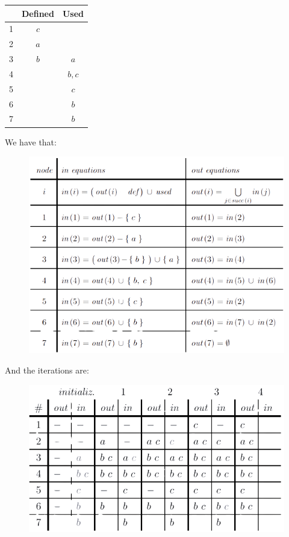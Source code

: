 \documentclass[12pt, a4paper]{report}
\newtheorem[style=M, bodystyle=\normalfont]{theorem}{Theorem}
\newtheorem[style=M, bodystyle=\normalfont]{corollary}{Corollary}
\newtheorem[style=M, bodystyle=\normalfont]{lemma}{Lemma}
\newtheorem[style=M, bodystyle=\normalfont]{definition}{Definition}
\begin{document}
\begin{enumerate}
\begin{table}[H]
                    \centering
                    \begin{tabular}{l|c|c|}
                    \cline{2-3}
                                            & \textbf{Defined} & \textbf{Used} \\ \hline
                    \multicolumn{1}{|l|}{1} & $c$              &               \\
                    \multicolumn{1}{|l|}{2} & $a$              &               \\
                    \multicolumn{1}{|l|}{3} & $b$              & $a$           \\
                    \multicolumn{1}{|l|}{4} &                  & $b,c$         \\
                    \multicolumn{1}{|l|}{5} &                  & $c$           \\
                    \multicolumn{1}{|l|}{6} &                  & $b$           \\
                    \multicolumn{1}{|l|}{7} &                  & $b$           \\ \hline
                    \end{tabular}
                \end{table}
                We have that: 
                \begin{figure}[H]
                    \centering
                    \includegraphics[width=0.75\linewidth]{images/dataflow.png}
                \end{figure} 
                And the iterations are: 
                \begin{figure}[H]
                    \centering
                    \includegraphics[width=0.75\linewidth]{images/dataflowit.png}

\end{figure}
\end{enumerate}
\end{document}
